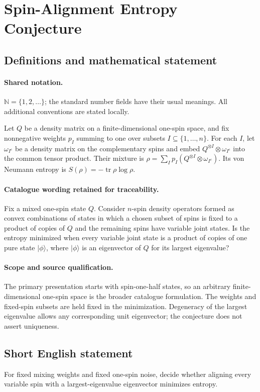 \documentclass[11pt]{article}
\begin{document}
\section{Spin-Alignment Entropy Conjecture}\label{statement}

\subsection{Definitions and mathematical statement}

\paragraph{Shared notation.}$\mathbb N=\{1,2,\ldots\}$; the standard number fields have their usual meanings. All additional conventions are stated locally.


Let $Q$ be a density matrix on a finite-dimensional one-spin space, and fix nonnegative weights $p_I$ summing to one over subsets $I\subseteq\{1,\ldots,n\}$. For each $I$, let $\omega_{I^c}$ be a density matrix on the complementary spins and embed $Q^{\otimes I}\otimes\omega_{I^c}$ into the common tensor product. Their mixture is $\rho=\sum_Ip_I(Q^{\otimes I}\otimes\omega_{I^c})$. Its von Neumann entropy is $S(\rho)=-\operatorname{tr}\rho\log\rho$.

\paragraph{Catalogue wording retained for traceability.}
Fix a mixed one-spin state $Q$. Consider $n$-spin density operators formed as convex combinations of states in which a chosen subset of spins is fixed to a product of copies of $Q$ and the remaining spins have variable joint states. Is the entropy minimized when every variable joint state is a product of copies of one pure state $|\phi\rangle$, where $|\phi\rangle$ is an eigenvector of $Q$ for its largest eigenvalue?

\paragraph{Scope and source qualification.}The primary presentation starts with spin-one-half states, so an arbitrary finite-dimensional one-spin space is the broader catalogue formulation. The weights and fixed-spin subsets are held fixed in the minimization. Degeneracy of the largest eigenvalue allows any corresponding unit eigenvector; the conjecture does not assert uniqueness.
\subsection{Short English statement}
For fixed mixing weights and fixed one-spin noise, decide whether aligning every variable spin with a largest-eigenvalue eigenvector minimizes entropy.
\end{document}

